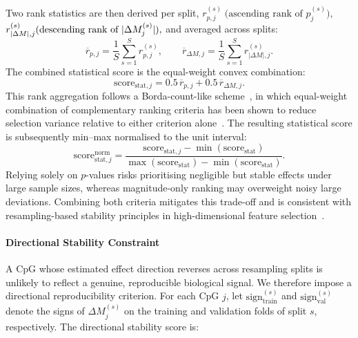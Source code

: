 \noindent Two rank statistics are then derived per split,
\(
r_{p,j}^{(s)} \; \text{(ascending rank of } p_{j}^{(s)}),\)
\(r_{|\Delta M|,j}^{(s)} \\ 
\text{(descending rank of } |\Delta M_{j}^{(s)}|),
\)
and averaged across splits:
\begin{equation}
\overline{r}_{p,j}
=
\frac{1}{S}\sum_{s=1}^{S} r_{p,j}^{(s)},
\qquad
\overline{r}_{\Delta M,j}
=
\frac{1}{S}\sum_{s=1}^{S} r_{|\Delta M|,j}^{(s)}.
\end{equation}
The combined statistical score is the equal-weight convex 
combination:
\begin{equation}
\mathrm{score}_{\mathrm{stat},j}
=
0.5\,\overline{r}_{p,j}
+
0.5\,\overline{r}_{\Delta M,j}.
\end{equation}
This rank aggregation follows a Borda-count-like scheme~\cite{Fagin2003}, in which equal-weight combination of complementary ranking criteria has been shown to reduce selection variance relative to either criterion alone~\cite{Dwork2001}.
The resulting statistical score is subsequently min--max normalised 
to the unit interval:
\[
\mathrm{score}_{\mathrm{stat},j}^{\mathrm{norm}}
=
\frac{
\mathrm{score}_{\mathrm{stat},j}
-
\min(\mathrm{score}_{\mathrm{stat}})
}{
\max(\mathrm{score}_{\mathrm{stat}})
-
\min(\mathrm{score}_{\mathrm{stat}})
}.
\]
Relying solely on $p$-values risks prioritising negligible 
but stable effects under large sample sizes, whereas 
magnitude-only ranking may overweight noisy large 
deviations. Combining both criteria mitigates this trade-off and is consistent with resampling-based stability principles in high-dimensional feature selection~\cite{Meinshausen2010}.

\paragraph{Directional Stability Constraint}

A CpG whose estimated effect direction reverses across 
resampling splits is unlikely to reflect a genuine, 
reproducible biological signal. We therefore impose a 
directional reproducibility criterion. For each CpG $j$, 
let $\mathrm{sign}_{\mathrm{train}}^{(s)}$ and 
$\mathrm{sign}_{\mathrm{val}}^{(s)}$ denote the signs of 
$\Delta M_j^{(s)}$ on the training and validation folds 
of split $s$, respectively. The directional stability 
score is:


